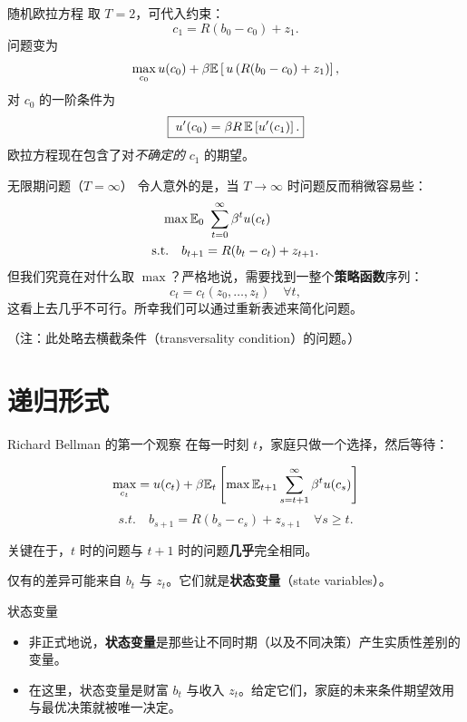 \documentclass[10pt,aspectratio=169]{beamer}
\begin{document}
\begin{frame}{随机欧拉方程}
  取 $T = 2$，可代入约束：
  \[
    c_1 = R(b_0 - c_0) + z_1.
  \]
  问题变为
  \[
    \max_{c_0} u(c_0) + \beta \mathbb{E}\left[\, u\left(R(b_0 - c_0) + z_1\right) \right],
  \]
  对 $c_0$ 的一阶条件为
  \[
    \boxed{\;u'(c_0) = \beta R \, \mathbb{E}\left[ u'(c_1) \right].}
  \]
  欧拉方程现在包含了对\emph{不确定的} $c_1$ 的期望。
\end{frame}

\begin{frame}{无限期问题（$T = \infty$）}
  令人意外的是，当 $T\to\infty$ 时问题反而稍微容易些：
  \begin{align*}
    \max \mathbb{E}_0 & \ \sum_{t=0}^{\infty} \beta^t u(c_t)\\
    \text{s.t.}\quad b_{t+1} &= R(b_t - c_t) + z_{t+1}.
  \end{align*}
  但我们究竟在对什么取 $\max$？严格地说，需要找到一整个\textbf{策略函数}序列：
  \[
    c_t = c_t(z_0, \ldots, z_t) \quad \forall t,
  \]
  这看上去几乎不可行。所幸我们可以通过重新表述来简化问题。

  （注：此处略去横截条件（transversality condition）的问题。）
\end{frame}

\section{递归形式}

\begin{frame}{Richard Bellman 的第一个观察}
  在每一时刻 $t$，家庭只做一个选择，然后等待：

  \[
    \max_{c_t} = u(c_t) + \beta \mathbb{E}_t\left[ \max \mathbb{E}_{t+1}\sum_{s=t+1}^\infty \beta^t u(c_s) \right]
  \]
  \[
    s.t. \quad b_{s+1} = R(b_s - c_s) + z_{s+1} \quad\forall s \ge t.
  \]

  关键在于，$t$ 时的问题与 $t+1$ 时的问题\textbf{几乎}完全相同。

  仅有的差异可能来自 $b_t$ 与 $z_t$。它们就是\textbf{状态变量}（state variables）。
\end{frame}

\begin{frame}{状态变量}
  \begin{itemize}
    \item 非正式地说，\textbf{状态变量}是那些让不同时期（以及不同决策）产生实质性差别的变量。
    \item 在这里，状态变量是财富 $b_t$ 与收入 $z_t$。给定它们，家庭的未来条件期望效用与最优决策就被唯一决定。
  \end{itemize}
\end{frame}
\end{document}

